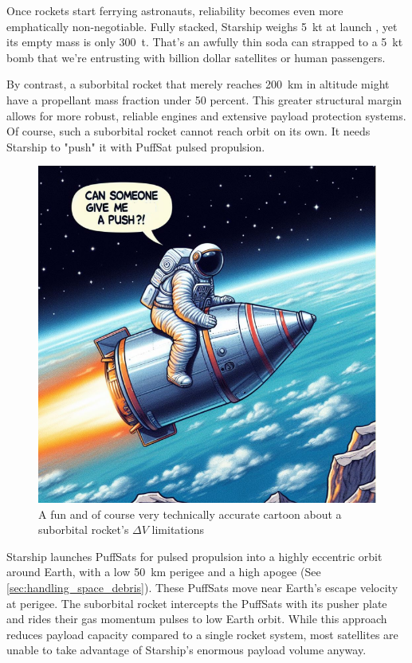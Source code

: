 \documentclass{article}
\begin{document}
{Once rockets start ferrying astronauts, reliability becomes even more emphatically non-negotiable. Fully stacked, Starship weighs \SI{5}{\kilo\tonne} at launch \cite{starship}, yet its empty mass is only \SI{300}{\tonne}. That’s an awfully thin soda can strapped to a \SI{5}{\kilo\tonne} bomb that we're entrusting with billion dollar satellites or human passengers.

By contrast, a suborbital rocket that merely reaches \SI{200}{\kilo\meter} in altitude might have a propellant mass fraction under 50 percent. This greater structural margin allows for more robust, reliable engines and extensive payload protection systems. Of course, such a suborbital rocket cannot reach orbit on its own.  It needs Starship to "push" it with PuffSat pulsed propulsion.

\begin{figure}[htpb]
    \centering
    \includegraphics[width=0.5\linewidth]{images/suborbital_push_cartoon.png}
    \caption{A fun and of course very technically accurate cartoon about a suborbital rocket's $\Delta V$ limitations}
    \label{fig:suborbital-cartoon}
\end{figure}

Starship launches PuffSats for pulsed propulsion into a highly eccentric orbit around Earth, with a low \SI{50}{\kilo\meter} perigee and a high apogee (See \autoref{sec:handling_space_debris}). These PuffSats move near Earth’s escape velocity at perigee. The suborbital rocket intercepts the PuffSats with its pusher plate and rides their gas momentum pulses to low Earth orbit. While this approach reduces payload capacity compared to a single rocket system, most satellites are unable to take advantage of Starship’s enormous payload volume anyway.

}
\end{document}
